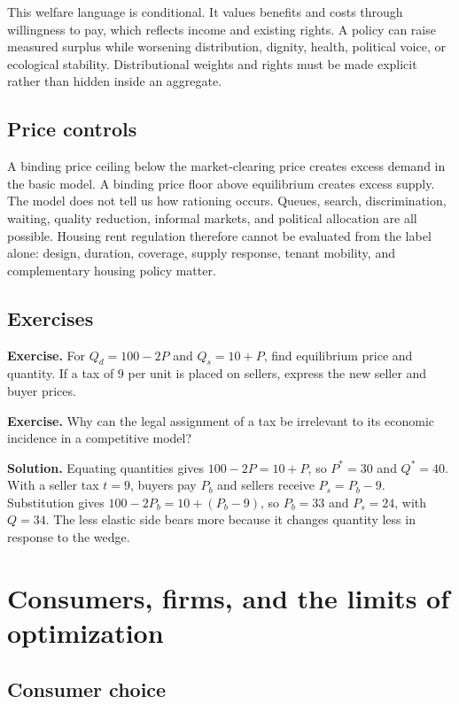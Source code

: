 \documentclass[11pt,oneside,openany]{book}
\newcommand{\exercise}[1]{\textbf{Exercise.} #1}
\newcommand{\solution}[1]{\textbf{Solution.} #1}
\begin{document}
This welfare language is conditional. It values benefits and costs through willingness to pay, which reflects income and existing rights. A policy can raise measured surplus while worsening distribution, dignity, health, political voice, or ecological stability. Distributional weights and rights must be made explicit rather than hidden inside an aggregate.

\section{Price controls}

A binding price ceiling below the market-clearing price creates excess demand in the basic model. A binding price floor above equilibrium creates excess supply. The model does not tell us how rationing occurs. Queues, search, discrimination, waiting, quality reduction, informal markets, and political allocation are all possible. Housing rent regulation therefore cannot be evaluated from the label alone: design, duration, coverage, supply response, tenant mobility, and complementary housing policy matter.

\section{Exercises}

\exercise{For $Q_d=100-2P$ and $Q_s=10+P$, find equilibrium price and quantity. If a tax of 9 per unit is placed on sellers, express the new seller and buyer prices.}

\exercise{Why can the legal assignment of a tax be irrelevant to its economic incidence in a competitive model?}

\solution{Equating quantities gives $100-2P=10+P$, so $P^*=30$ and $Q^*=40$. With a seller tax $t=9$, buyers pay $P_b$ and sellers receive $P_s=P_b-9$. Substitution gives $100-2P_b=10+(P_b-9)$, so $P_b=33$ and $P_s=24$, with $Q=34$. The less elastic side bears more because it changes quantity less in response to the wedge.}

\chapter{Consumers, firms, and the limits of optimization}
\label{ch:agents}

\section{Consumer choice}
\end{document}
